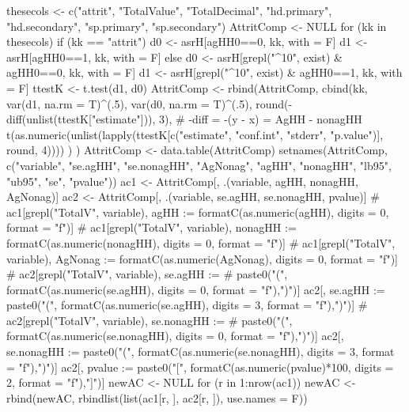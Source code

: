 \begin{Schunk}
\begin{Sinput}
thesecols <- c("attrit", "TotalValue", "TotalDecimal", 
  "hd.primary", "hd.secondary", "sp.primary", "sp.secondary")
AttritComp <- NULL
for (kk in thesecols) {
  if (kk == "attrit") {
    d0 <- asrH[agHH0==0, kk, with = F]
    d1 <- asrH[agHH0==1, kk, with = F]
  } else {
    d0 <- asrH[grepl("^10", exist) & agHH0==0, kk, with = F]
    d1 <- asrH[grepl("^10", exist) & agHH0==1, kk, with = F]
  }
  ttestK <- t.test(d1, d0)
  AttritComp <- rbind(AttritComp,
    cbind(kk, var(d1, na.rm = T)^(.5), var(d0, na.rm = T)^(.5),
      round(-diff(unlist(ttestK["estimate"])), 3), # -diff = -(y - x) = AgHH - nonagHH
      t(as.numeric(unlist(lapply(ttestK[c("estimate", "conf.int", "stderr", "p.value")], round, 4))))
    )
  )
}
AttritComp <- data.table(AttritComp)
setnames(AttritComp, c("variable", "se.agHH", "se.nonagHH", "AgNonag", "agHH", "nonagHH", 
  "lb95", "ub95", "se", "pvalue"))
ac1 <- AttritComp[, .(variable, agHH, nonagHH, AgNonag)]
ac2 <- AttritComp[, .(variable, se.agHH, se.nonagHH, pvalue)]
# ac1[grepl("TotalV", variable), agHH := formatC(as.numeric(agHH), digits = 0, format = "f")]
# ac1[grepl("TotalV", variable), nonagHH := formatC(as.numeric(nonagHH), digits = 0, format = "f")]
# ac1[grepl("TotalV", variable), AgNonag := formatC(as.numeric(AgNonag), digits = 0, format = "f")]
# ac2[grepl("TotalV", variable), se.agHH := 
#   paste0("(", formatC(as.numeric(se.agHH), digits = 0, format = "f"),")")]
 ac2[, se.agHH := 
   paste0("(", formatC(as.numeric(se.agHH), digits = 3, format = "f"),")")]
# ac2[grepl("TotalV", variable), se.nonagHH := 
#   paste0("(", formatC(as.numeric(se.nonagHH), digits = 0, format = "f"),")")]
 ac2[, se.nonagHH := 
   paste0("(", formatC(as.numeric(se.nonagHH), digits = 3, format = "f"),")")]
ac2[, pvalue := 
  paste0("[", formatC(as.numeric(pvalue)*100, digits = 2, format = "f"),"]")]
newAC <- NULL
for (r in 1:nrow(ac1))
  newAC <- rbind(newAC, rbindlist(list(ac1[r, ], ac2[r, ]), use.names = F))


\end{Sinput}
\end{Schunk}

